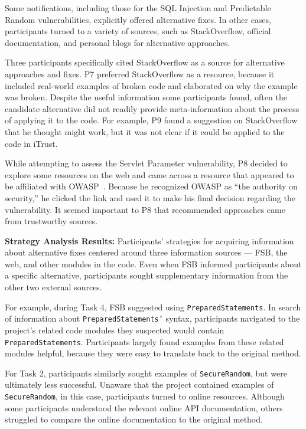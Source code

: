 \documentclass[10pt,journal,compsoc]{IEEEtran}
\begin{document}
Some notifications, including those for the SQL Injection and Predictable Random vulnerabilities, explicitly offered alternative fixes. 
In other cases, participants turned to a variety of sources, such as StackOverflow, official documentation, and personal blogs for alternative approaches.
 
Three participants specifically cited StackOverflow as a source for alternative approaches and fixes.
P7 preferred StackOverflow as a resource, because it included real-world examples of broken code and elaborated on why the example was broken.
Despite the useful information some participants found, often the candidate alternative did not readily provide meta-information about the process of applying it to the code. 
For example, P9 found a suggestion on StackOverflow that he thought might work, but it was not clear if it could be applied to the code in iTrust.

While attempting to assess the Servlet Parameter vulnerability, P8 decided to explore some resources on the web and came across a resource that appeared to be affiliated with OWASP~\cite{OWASP}. 
Because he recognized OWASP as ``the authority on security,'' he clicked the link and used it to make his final decision regarding the vulnerability. 
It seemed important to P8 that recommended approaches came from trustworthy sources.


\textbf{Strategy Analysis Results:}
Participants' strategies for acquiring information about alternative fixes centered around three information sources --- FSB, the web, and other modules in the code. 
Even when FSB informed participants about a specific alternative, participants sought supplementary information from the other two external sources.

For example, during Task 4, FSB suggested using \texttt{PreparedStatements}. 
In search of information about \texttt{PreparedStatements'} syntax, participants navigated to the project's related code modules they suspected would contain \texttt{PreparedStatements}.
Participants largely found examples from these related modules helpful, because they were easy to translate back to the original method.

For Task 2, participants similarly sought examples of \texttt{SecureRandom}, but were ultimately less successful.
Unaware that the project contained examples of \texttt{SecureRandom}, in this case, participants turned to online resources.
Although some participants understood the relevant online API documentation, others struggled to compare the online documentation to the original method.
\end{document}
